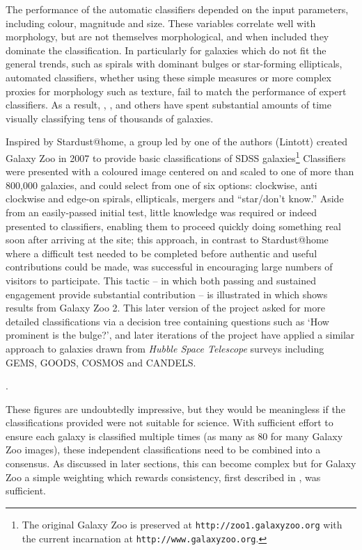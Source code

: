 \documentclass{ar2e}
\begin{document}
The performance of the automatic classifiers depended on the input parameters,
including colour, magnitude and size. These variables correlate well with
morphology, but are not themselves morphological, and when included they
dominate the classification. In particularly for galaxies which do not fit the
general trends, such as spirals with dominant bulges or star-forming
ellipticals, automated classifiers, whether using these simple measures or
more complex proxies for morphology such as texture, fail to match the
performance of expert classifiers. As a result, \citet{Scha2007},
\citet{Nair}, and others have spent substantial amounts of time visually
classifying tens of thousands of galaxies. 

Inspired by Stardust@home, a group led by one of the authors (Lintott) created
Galaxy Zoo in 2007 to provide basic classifications of SDSS
galaxies\footnote{The original Galaxy Zoo is preserved at
\texttt{http://zoo1.galaxyzoo.org} with the current incarnation at
\texttt{http://www.galaxyzoo.org}.} Classifiers were presented with a coloured
image centered on and scaled to one of more than 800,000 galaxies, and could
select from one of six options: clockwise, anti clockwise and edge-on spirals,
ellipticals, mergers and ``star/don't know.'' Aside from  an easily-passed
initial test, little knowledge was required or indeed presented to classifiers,
enabling them to proceed quickly doing something real soon after arriving at the
site; this approach, in contrast to Stardust@home where a difficult test needed
to be completed before authentic and useful contributions could be made, was
successful in encouraging large numbers of visitors to participate. This tactic
-- in which both passing and sustained engagement provide substantial
contribution -- is illustrated in \Fref{}  which shows results from Galaxy Zoo
2. 
This later version of the project asked for more detailed
classifications via a decision tree containing questions such as `How prominent
is the bulge?', and later iterations of the project have applied a similar
approach to galaxies drawn from \emph{Hubble Space Telescope} surveys including
\textsc{GEMS, GOODS, COSMOS} and \textsc{CANDELS}. 

. 

These figures are undoubtedly impressive, but they would be meaningless if the
classifications provided were not suitable for science. With sufficient effort
to ensure each galaxy is classified multiple times (as many as 80 for many
Galaxy Zoo images), these independent classifications need to be combined into a
consensus. As discussed in later sections, this can become complex but for
Galaxy Zoo a simple weighting which rewards consistency, first described in
\citet{Land++}, was sufficient. 
\end{document}
